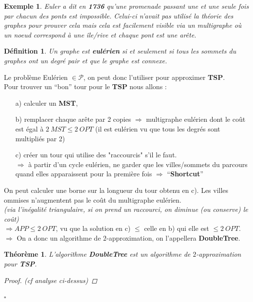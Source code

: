 \documentclass{article}
\newcommand{\titre}[1]{\textcolor{title}{#1}}
\newcommand{\cqfd}{\begin{flushright}$\square$\end{flushright}}
\newtheorem{de}{D\'efinition}[section]
\newtheorem{exemple}{Exemple}[section]
\newtheorem{thm}{Th\'eor\`eme}[section]
\newtheorem{proof}{Preuve}[section]
\begin{document}
\begin{sffamily}
\begin{exemple}
Euler a dit en \textbf{1736} qu'une promenade passant une et une seule fois par chacun des ponts est impossible.
Celui-ci n'avait pas utilisé la théorie des graphes pour prouver cela mais cela est facilement visible via un multigraphe où un noeud 
correspond à une île/rive et chaque pont est une arête.
\end{exemple}

\begin{de}
Un graphe est \textbf{eulérien} si et seulement si tous les sommets du graphes ont un degré pair et que le graphe est connexe.
\end{de}

\noindent Le problème Eulérien $\in \mathcal{P}$, on peut donc l'utiliser pour approximer \textbf{\titre{TSP}}.\\
Pour trouver un ``bon'' tour pour le \textbf{\titre{TSP}} nous allons :
\begin{enumerate}
\item[a)] calculer un \textbf{\titre{MST}},
\item[b)] remplacer chaque arête par 2 copies $\Rightarrow$ multigraphe eulérien dont le coût est égal à $2\ MST\leq 2\ OPT$ 
(il est eulérien vu que tous les degrés sont multipliés par 2) 
\item[c)] créer un tour qui utilise des "raccourcis" s'il le faut. \\
$\Rightarrow$ à partir d'un cycle eulérien, ne garder que les villes/sommets du parcours quand elles apparaissent pour la première fois 
$\Rightarrow$ ``\textbf{Shortcut}''\\
\end{enumerate}
On peut calculer une borne sur la longueur du tour obtenu en c). Les villes ommises n'augmentent pas le coût du multigraphe eulérien. \\
\textit{(via l'inégalité triangulaire, si on prend un raccourci, on diminue (ou conserve) le coût)} \\
$\Rightarrow APP \leq 2\ OPT$, vu que la solution en c) $\leq$ celle en b) qui elle est $\leq 2\ OPT$. \\
$\Longrightarrow$ On a donc un algorithme de $2$-approximation, on l'appellera \textbf{DoubleTree}.

\begin{thm}
L'algorithme \textbf{DoubleTree} est un algorithme de $2$-approximation pour \textbf{\titre{TSP}}.
\begin{proof} (cf analyse ci-dessus)
\end{proof}
\cqfd
\end{thm}


\end{sffamily}
\end{document}
